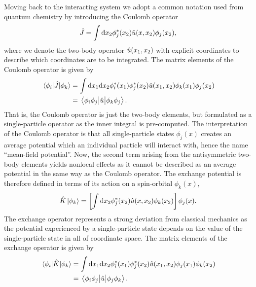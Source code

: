             Moving back to the interacting system we adopt a common notation
            used from quantum chemistry \cite{szabo1996modern} by introducing
            the Coulomb operator
            \begin{align}
                \hat{J}
                = \int \dd x_2
                \phi^{*}_j(x_2)\hat{u}(x, x_2)
                \phi_j(x_2),
            \end{align}
            where we denote the two-body operator $\hat{u}(x_1, x_2)$ with
            explicit coordinates to describe which coordinates are to be
            integrated.
            The matrix elements of the Coulomb operator is given by
            \begin{align}
                \mel{\phi_i}{\hat{J}}{\phi_k}
                &= \int\dd x_1\dd x_2
                \phi^{*}_i(x_1)\phi^{*}_j(x_2)
                \hat{u}(x_1, x_2)
                \phi_k(x_1)\phi_j(x_2)
                \\
                &=
                \mel{\phi_i\phi_j}{\hat{u}}{\phi_k\phi_j}.
            \end{align}
            That is, the Coulomb operator is just the two-body elements, but
            formulated as a single-particle operator as the inner integral is
            pre-computed.
            The interpretation of the Coulomb operator is that all
            single-particle states $\phi_j(x)$ creates an average potential
            which an individual particle will interact with, hence the name
            ``mean-field potential''.
            Now, the second term arising from the antisymmetric two-body
            elements yields nonlocal effects as it cannot be described as an
            average potential in the same way as the Coulomb operator.
            The exchange potential is therefore defined in terms of its action
            on a spin-orbital $\phi_k(x)$,
            \begin{align}
                \hat{K}\ket{\phi_k}
                = \left[ 
                    \int\dd x_2 \phi^{*}_j(x_2)\hat{u}(x, x_2)\phi_k(x_2)
                 \right]\phi_j(x).
            \end{align}
            The exchange operator represents a strong deviation from classical
            mechanics as the potential experienced by a single-particle state
            depends on the value of the single-particle state in all of
            coordinate space.
            The matrix elements of the exchange operator is given by
            \begin{align}
                \mel{\phi_i}{\hat{K}}{\phi_k}
                &= \int\dd x_1\dd x_2
                \phi^{*}_i(x_1)\phi^{*}_j(x_2)
                \hat{u}(x_1, x_2)
                \phi_j(x_1)\phi_k(x_2)
                \\
                &=
                \mel{\phi_i\phi_j}{\hat{u}}{\phi_j\phi_k}.
            \end{align}
